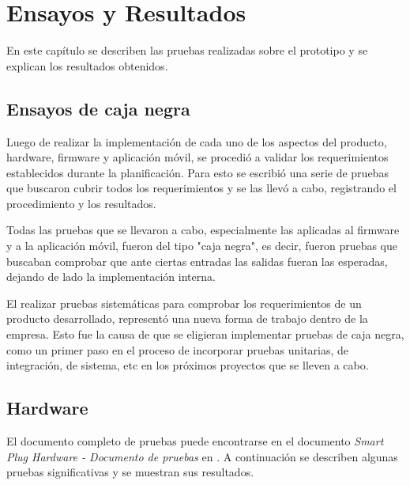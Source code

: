 
\chapter{Ensayos y Resultados} %

\label{Chapter4} %


En este capítulo se describen las pruebas realizadas sobre el prototipo y se explican los resultados obtenidos.

\section{Ensayos de caja negra}

Luego de realizar la implementación de cada uno de los aspectos del producto, hardware, firmware y aplicación móvil, se procedió a validar los requerimientos establecidos durante la planificación. Para esto se escribió una serie de pruebas que buscaron cubrir todos los requerimientos y se las llevó a cabo, registrando el procedimiento y los resultados.

Todas las pruebas que se llevaron a cabo, especialmente las aplicadas al firmware y a la aplicación móvil, fueron del tipo "caja negra", es decir, fueron pruebas que buscaban comprobar que ante ciertas entradas las salidas fueran las esperadas, dejando de lado la implementación interna.

El realizar pruebas sistemáticas para comprobar los requerimientos de un producto desarrollado, representó una nueva forma de trabajo dentro de la empresa. Esto fue la causa de que se eligieran implementar pruebas de caja negra, como un primer paso en el proceso de incorporar pruebas unitarias, de integración, de sistema, etc en los próximos proyectos que se lleven a cabo.

\section{Hardware}

El documento completo de pruebas puede encontrarse en el documento \textit{Smart Plug Hardware - Documento de pruebas} en \citep{repo_hardware}. A continuación se describen algunas pruebas significativas y se muestran sus resultados.

